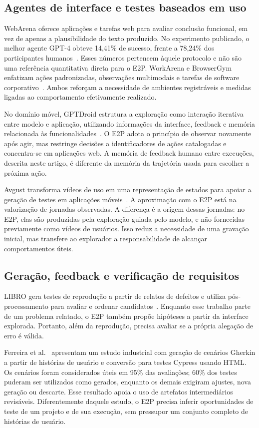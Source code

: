 \documentclass[12pt]{article}
\begin{document}
\subsection{Agentes de interface e testes baseados em uso}
WebArena oferece aplicações e tarefas web para avaliar conclusão funcional, em vez de apenas a plausibilidade do texto produzido. No experimento publicado, o melhor agente GPT-4 obteve 14,41\% de sucesso, frente a 78,24\% dos participantes humanos~\cite{zhou2024webarena}. Esses números pertencem àquele protocolo e não são uma referência quantitativa direta para o E2P. WorkArena e BrowserGym enfatizam ações padronizadas, observações multimodais e tarefas de software corporativo~\cite{drouin2024workarena}. Ambos reforçam a necessidade de ambientes registráveis e medidas ligadas ao comportamento efetivamente realizado.

No domínio móvel, GPTDroid estrutura a exploração como interação iterativa entre modelo e aplicação, utilizando informações da interface, feedback e memória relacionada às funcionalidades~\cite{liu2024gptdroid}. O E2P adota o princípio de observar novamente após agir, mas restringe decisões a identificadores de ações catalogadas e concentra-se em aplicações web. A memória de feedback humano entre execuções, descrita neste artigo, é diferente da memória da trajetória usada para escolher a próxima ação.

Avgust transforma vídeos de uso em uma representação de estados para apoiar a geração de testes em aplicações móveis~\cite{zhao2022avgust}. A aproximação com o E2P está na valorização de jornadas observadas. A diferença é a origem dessas jornadas: no E2P, elas são produzidas pela exploração guiada pelo modelo, e não fornecidas previamente como vídeos de usuários. Isso reduz a necessidade de uma gravação inicial, mas transfere ao explorador a responsabilidade de alcançar comportamentos úteis.

\subsection{Geração, feedback e verificação de requisitos}
LIBRO gera testes de reprodução a partir de relatos de defeitos e utiliza pós-processamento para avaliar e ordenar candidatos~\cite{kang2023libro}. Enquanto esse trabalho parte de um problema relatado, o E2P também propõe hipóteses a partir da interface explorada. Portanto, além da reprodução, precisa avaliar se a própria alegação de erro é válida.

Ferreira et al.~\cite{ferreira2025acceptance} apresentam um estudo industrial com geração de cenários Gherkin a partir de histórias de usuário e conversão para testes Cypress usando HTML. Os cenários foram considerados úteis em 95\% das avaliações; 60\% dos testes puderam ser utilizados como gerados, enquanto os demais exigiram ajustes, nova geração ou descarte. Esse resultado apoia o uso de artefatos intermediários revisáveis. Diferentemente daquele estudo, o E2P precisa inferir oportunidades de teste de um projeto e de sua execução, sem pressupor um conjunto completo de histórias de usuário.
\end{document}

